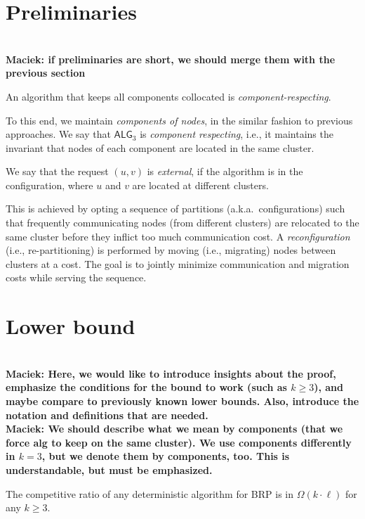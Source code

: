 \documentclass[manuscript,screen=true]{acmart}
\newcommand{\OBRP}{BRP}
\newcommand{\TAlg}{{\ensuremath{\textsf{ALG}_{3}}}\xspace} %
\newcommand\maciek[1]{\color{brown}\textbf{\\ Maciek: #1}\color{black}}
\begin{document}
\section{Preliminaries}

\maciek{if preliminaries are short, we should merge them with the previous section}

An algorithm that  keeps all components collocated is \emph{component-respecting}.

To this end, we maintain \emph{components of nodes}, in the similar fashion to previous approaches\cite{repartition-disc}.
We say that \TAlg is \emph{component respecting}, i.e., it maintains the invariant that nodes of each component are located in the same cluster.

We say that the request $(u,v)$ is \emph{external}, if the algorithm is in the configuration, where $u$ and $v$ are located at different clusters.


This is achieved by opting a sequence of  partitions (a.k.a.~configurations)
such that frequently communicating nodes (from different clusters)
are relocated to the same cluster before they inflict too much communication cost.
A \emph{reconfiguration} (i.e., re-partitioning) is performed by
moving (i.e., migrating) nodes between clusters at a cost.
The goal is to jointly minimize communication and migration costs while serving the sequence.

\section{Lower bound} %
\label{sec:lowerbound}


\maciek{Here, we would like to introduce insights about the proof, emphasize the conditions for the bound to work (such as $k\geq 3$), and maybe compare to previously known lower bounds. Also, introduce the notation and definitions that are needed.}
\maciek{We should describe what we mean by  components (that we force alg to keep on the same cluster). We use components differently in $k=3$, but we denote them by components, too. This is understandable, but must be emphasized.}

\begin{theorem}
	The competitive ratio of any deterministic algorithm for \OBRP{} is in $\Omega(k\cdot \ell)$ for any $k\geq 3$.
\end{theorem}
\end{document}

